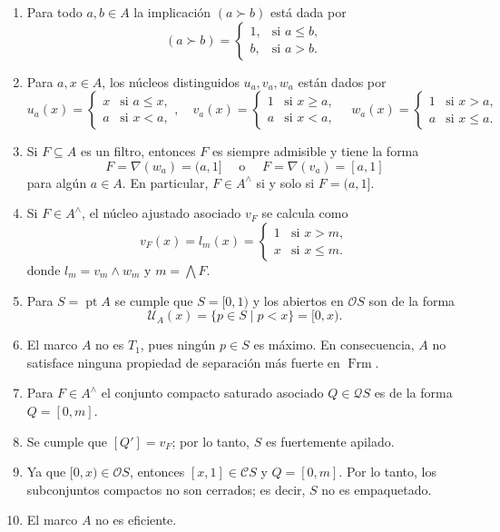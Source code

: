 \documentclass[11pt]{amsart}
\DeclareMathOperator{\pt}{pt}
\DeclareMathOperator{\Frm}{Frm}
\theoremstyle{plain}
\theoremstyle{definition}
\begin{document}
\begin{enumerate}
\item Para todo $a,b\in A$ la implicación $(a\succ b)$ está dada por
\[
(a\succ b)=\begin{cases}
1, & \text{si } a\leq b,\\
b, & \text{si } a>b.
\end{cases}
\]
\item Para $a, x\in A$, los núcleos distinguidos $u_a, v_a, w_a$ están dados por
\[
u_a(x)=\begin{cases}
  x & \text{si }a\leq x,\\
  a & \text{si }x< a,
\end{cases}, \quad v_a(x)=\begin{cases}
1 & \text{si } x\geq a,\\
a & \text{si } x<a,
\end{cases} \quad w_a(x)=\begin{cases}
1 & \text{si } x>a,\\
a & \text{si } x\leq a.
\end{cases}
\]

\item Si $F\subseteq A$ es un filtro, entonces $F$ es siempre admisible y tiene la forma
\[
F=\nabla(w_a)=(a, 1]\quad \mbox{ o }\quad F=\nabla(v_a)=[a, 1]
\]
para algún $a\in A$. En particular, $F\in A^\wedge$ si y solo si $F=(a, 1]$.

\item Si $F\in A^\wedge$, el núcleo ajustado asociado $v_F$ se calcula como
\begin{equation}\label{eq:lm}
v_F(x)=l_m(x)=\begin{cases}
1 & \text{si } x> m,\\
x & \text{si } x\leq m.
\end{cases}
\end{equation}
donde $l_m=v_m\wedge w_m$ y $m=\bigwedge F$.
\item Para $S=\pt A$ se cumple que $S=[0,1)$ y los abiertos en $\mathcal{O}S$ son de la forma
\[
\mathcal{U}_A(x)=\{p\in S\mid p<x\}=[0,x).
\]
\item El marco $A$ no es $T_1$, pues ningún $p\in S$ es máximo. En consecuencia, $A$ no satisface ninguna propiedad de separación más fuerte en $\Frm$.
\item Para $F\in A^\wedge$ el conjunto compacto saturado asociado $Q\in \mathcal{Q}S$ es de la forma $Q=[0,m]$.
\item Se cumple que $[Q']=v_F$; por lo tanto, $S$ es fuertemente apilado.
\item Ya que $[0, x)\in \mathcal{O}S$, entonces $[x, 1]\in \mathcal{C}S$ y $Q=[0, m]$. Por lo tanto, los subconjuntos compactos no son cerrados; es decir, $S$ no es empaquetado.
\item El marco $A$ no es eficiente.

\end{enumerate}
\end{document}
